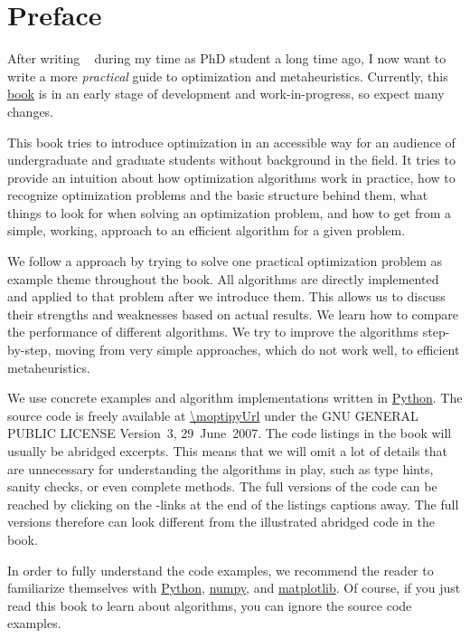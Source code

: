 \chapter*{Preface}%
%
%
After writing ~\cite{W2009GOATAA} during my time as PhD student a long time ago, I now want to write a more \emph{practical} guide to optimization and metaheuristics.
Currently, this \href{\oaUrl/index.html}{book} is in an early stage of development and work-in-progress, so expect many changes.

This book tries to introduce optimization in an accessible way for an audience of undergraduate and graduate students without background in the field.
It tries to provide an intuition about how optimization algorithms work in practice, how to recognize optimization problems and the basic structure behind them, what things to look for when solving an optimization problem, and how to get from a simple, working,  approach to an efficient algorithm for a given problem.

We follow a  approach by trying to solve one practical optimization problem as example theme throughout the book.
All algorithms are directly implemented and applied to that problem after we introduce them.
This allows us to discuss their strengths and weaknesses based on actual results.
We learn how to compare the performance of different algorithms.
We try to improve the algorithms step-by-step, moving from very simple approaches, which do not work well, to efficient metaheuristics.

We use concrete examples and algorithm implementations written in \href{https://python.org}{Python}.
The source code is freely available at \url{\moptipyUrl} under the GNU GENERAL PUBLIC LICENSE Version~3, 29~June~2007.
The code listings in the book will usually be abridged excerpts.
This means that we will omit a lot of details that are unnecessary for understanding the algorithms in play, such as type hints, sanity checks, or even complete methods.
The full versions of the code can be reached by clicking on the -links at the end of the listings captions away.
The full versions therefore can look different from the illustrated abridged code in the book.

In order to fully understand the code examples, we recommend the reader to familiarize themselves with \href{https://python.org}{Python}, \href{https://numpy.org/}{numpy}, and \href{https://matplotlib.org/}{matplotlib}.
Of course, if you just read this book to learn about algorithms, you can ignore the source code examples.

